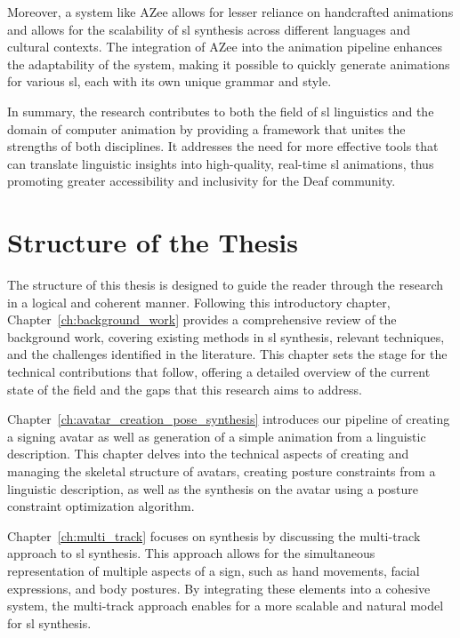 \documentclass[../../main.tex]{subfiles}
\begin{document}
Moreover, a system like AZee allows for lesser reliance on handcrafted animations and allows for the scalability of \gls{sl} synthesis across different languages and cultural contexts. The integration of AZee into the animation pipeline enhances the adaptability of the system, making it possible to quickly generate animations for various \gls{sl}, each with its own unique grammar and style.

In summary, the research contributes to both the field of \gls{sl} linguistics and the domain of computer animation by providing a framework that unites the strengths of both disciplines. It addresses the need for more effective tools that can translate linguistic insights into high-quality, real-time \gls{sl} animations, thus promoting greater accessibility and inclusivity for the Deaf community.

\section{Structure of the Thesis}
\label{ch:introduction:structure}

The structure of this thesis is designed to guide the reader through the research in a logical and coherent manner. Following this introductory chapter, Chapter~\ref{ch:background_work} provides a comprehensive review of the background work, covering existing methods in \gls{sl} synthesis, relevant techniques, and the challenges identified in the literature. This chapter sets the stage for the technical contributions that follow, offering a detailed overview of the current state of the field and the gaps that this research aims to address.

Chapter~\ref{ch:avatar_creation_pose_synthesis} introduces our pipeline of creating a signing avatar as well as generation of a simple animation from a linguistic description. This chapter delves into the technical aspects of creating and managing the skeletal structure of avatars, creating posture constraints from a linguistic description, as well as the synthesis on the avatar using a posture constraint optimization algorithm.

Chapter~\ref{ch:multi_track} focuses on synthesis by discussing the multi-track approach to \gls{sl} synthesis. This approach allows for the simultaneous representation of multiple aspects of a sign, such as hand movements, facial expressions, and body postures. By integrating these elements into a cohesive system, the multi-track approach enables for a more scalable and natural model for \gls{sl} synthesis. 
\end{document}
